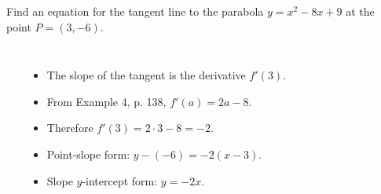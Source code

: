\begin{frame}
\begin{example}[Example 5, p. 139]
Find an equation for the tangent line to the parabola $y = x^2 - 8x + 9$ at the point $P = (3,-6)$.

\begin{columns}[c]
\ %
%
\begin{itemize}
\item<2->  The slope of the tangent is the derivative $f'(3)$.
\item<3->  From Example 4, p. 138, $f'(a) = 2a-8$.
\item<4->  Therefore $f'(3) = 2\cdot 3 - 8 = -2$.
\item<5->  Point-slope form: $y - (-6) = -2(x-3)$.
\item<6->  Slope $y$-intercept form: $y = -2x$.
\end{itemize}
\end{columns}
\end{example}
\end{frame}
